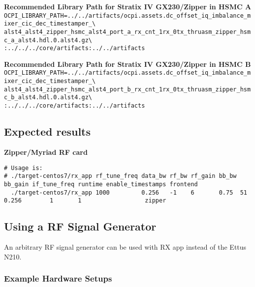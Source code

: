 \noindent\textbf{Recommended Library Path for Stratix IV GX230/Zipper in HSMC A}\\

\noindent
\verb|OCPI_LIBRARY_PATH=../../artifacts/ocpi.assets.dc_offset_iq_imbalance_mixer_cic_dec_timestamper_\| \\
\verb|alst4_alst4_zipper_hsmc_alst4_port_a_rx_cnt_1rx_0tx_thruasm_zipper_hsmc_a_alst4.hdl.0.alst4.gz\| \\
\verb|:../../../core/artifacts:../../artifacts| \\
\par\medskip

\noindent\textbf{Recommended Library Path for Stratix IV GX230/Zipper in HSMC B}\\

\noindent
\verb|OCPI_LIBRARY_PATH=../../artifacts/ocpi.assets.dc_offset_iq_imbalance_mixer_cic_dec_timestamper_\| \\
\verb|alst4_alst4_zipper_hsmc_alst4_port_b_rx_cnt_1rx_0tx_thruasm_zipper_hsmc_b_alst4.hdl.0.alst4.gz\| \\
\verb|:../../../core/artifacts:../../artifacts| \\
\par\medskip

\subsection{Expected results}

\noindent\textbf{Zipper/Myriad RF card}
\scriptsize
\noindent
\begin{verbatim}
# Usage is:
# ./target-centos7/rx_app rf_tune_freq data_bw rf_bw rf_gain bb_bw bb_gain if_tune_freq runtime enable_timestamps frontend
  ./target-centos7/rx_app 1000         0.256   -1    6       0.75  51      0.256        1       1                  zipper
\end{verbatim}
\small


\subsection{Using a RF Signal Generator}
\noindent An arbitrary RF signal generator can be used with RX app instead of the Ettus N210. \\

\subsubsection{Example Hardware Setups}

